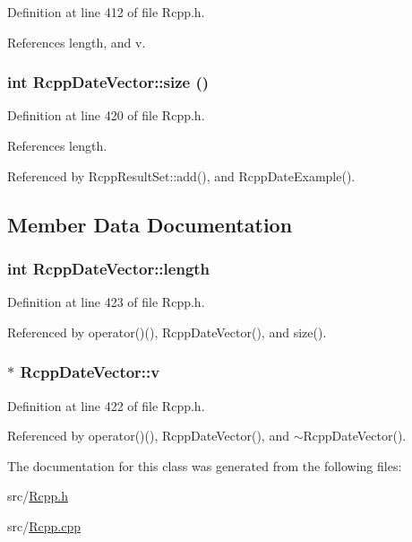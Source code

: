 Definition at line 412 of file Rcpp.h.

References length, and v.\hypertarget{classRcppDateVector_a03db4282da968eb4e0ae2a38375e0d37}{
\subsubsection[{size}]{\setlength{\rightskip}{0pt plus 5cm}int RcppDateVector::size ()}}
\label{classRcppDateVector_a03db4282da968eb4e0ae2a38375e0d37}


Definition at line 420 of file Rcpp.h.

References length.

Referenced by RcppResultSet::add(), and RcppDateExample().

\subsection{Member Data Documentation}
\hypertarget{classRcppDateVector_aa36764f68111a84b737b78600ff06433}{
\subsubsection[{length}]{\setlength{\rightskip}{0pt plus 5cm}int {\bf RcppDateVector::length}}}
\label{classRcppDateVector_aa36764f68111a84b737b78600ff06433}


Definition at line 423 of file Rcpp.h.

Referenced by operator()(), RcppDateVector(), and size().\hypertarget{classRcppDateVector_afaa34ebaf3d8bac309e81895c376f545}{
\subsubsection[{v}]{$\ast$ {\bf RcppDateVector::v}}}
\label{classRcppDateVector_afaa34ebaf3d8bac309e81895c376f545}


Definition at line 422 of file Rcpp.h.

Referenced by operator()(), RcppDateVector(), and $\sim$RcppDateVector().

The documentation for this class was generated from the following files:\begin{DoxyCompactItemize}
\item 
src/\hyperlink{Rcpp_8h}{Rcpp.h}\item 
src/\hyperlink{Rcpp_8cpp}{Rcpp.cpp}\end{DoxyCompactItemize}
